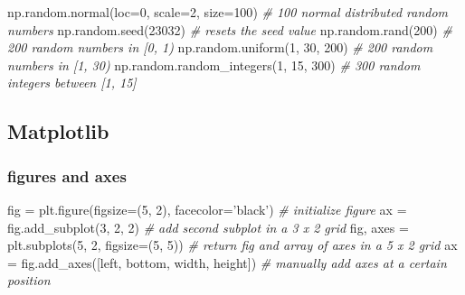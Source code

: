 \documentclass[10pt,a4paperpaper,twocolumn]{article}
\newenvironment{Shaded}{}{}
\newcommand{\DecValTok}[1]{\textcolor[rgb]{0.25,0.63,0.44}{{#1}}}
\newcommand{\StringTok}[1]{\textcolor[rgb]{0.25,0.44,0.63}{{#1}}}
\newcommand{\CommentTok}[1]{\textcolor[rgb]{0.38,0.63,0.69}{\textit{{#1}}}}
\newcommand{\OperatorTok}[1]{\textcolor[rgb]{0.40,0.40,0.40}{{#1}}}
\newcommand{\NormalTok}[1]{{#1}}
\begin{document}
\begin{Shaded}
\begin{Highlighting}[]
\NormalTok{np.random.normal(loc}\OperatorTok{=}\DecValTok{0}\NormalTok{, scale}\OperatorTok{=}\DecValTok{2}\NormalTok{, size}\OperatorTok{=}\DecValTok{100}\NormalTok{)  }\CommentTok{# 100 normal distributed random numbers}
\NormalTok{np.random.seed(}\DecValTok{23032}\NormalTok{)                       }\CommentTok{# resets the seed value}
\NormalTok{np.random.rand(}\DecValTok{200}\NormalTok{)                         }\CommentTok{# 200 random numbers in [0, 1)}
\NormalTok{np.random.uniform(}\DecValTok{1}\NormalTok{, }\DecValTok{30}\NormalTok{, }\DecValTok{200}\NormalTok{)               }\CommentTok{# 200 random numbers in [1, 30)}
\NormalTok{np.random.random_integers(}\DecValTok{1}\NormalTok{, }\DecValTok{15}\NormalTok{, }\DecValTok{300}\NormalTok{)       }\CommentTok{# 300 random integers between [1, 15]}
\end{Highlighting}
\end{Shaded}

\hypertarget{matplotlib}{\subsection{Matplotlib}\label{matplotlib}}

\hypertarget{figures-and-axes}{\subsubsection{figures and
axes}\label{figures-and-axes}}

\begin{Shaded}
\begin{Highlighting}[]
\NormalTok{fig }\OperatorTok{=} \NormalTok{plt.figure(figsize}\OperatorTok{=}\NormalTok{(}\DecValTok{5}\NormalTok{, }\DecValTok{2}\NormalTok{), facecolor}\OperatorTok{=}\StringTok{'black'}\NormalTok{)  }\CommentTok{# initialize figure}
\NormalTok{ax }\OperatorTok{=} \NormalTok{fig.add_subplot(}\DecValTok{3}\NormalTok{, }\DecValTok{2}\NormalTok{, }\DecValTok{2}\NormalTok{)                        }\CommentTok{# add second subplot in a 3 x 2 grid}
\NormalTok{fig, axes }\OperatorTok{=} \NormalTok{plt.subplots(}\DecValTok{5}\NormalTok{, }\DecValTok{2}\NormalTok{, figsize}\OperatorTok{=}\NormalTok{(}\DecValTok{5}\NormalTok{, }\DecValTok{5}\NormalTok{))       }\CommentTok{# return fig and array of axes in a 5 x 2 grid}
\NormalTok{ax }\OperatorTok{=} \NormalTok{fig.add_axes([left, bottom, width, height])     }\CommentTok{# manually add axes at a certain position}
\end{Highlighting}
\end{Shaded}
\end{document}
